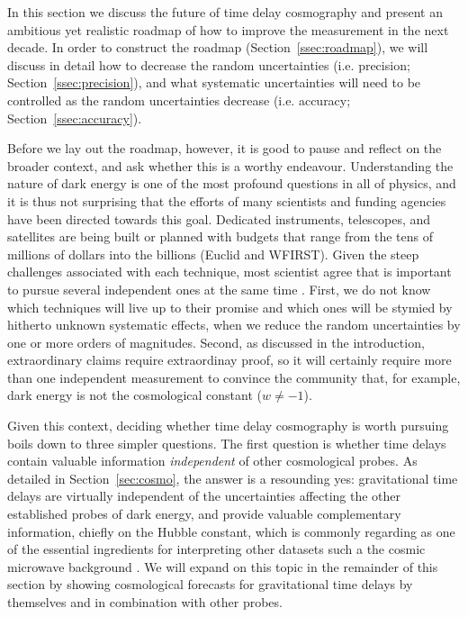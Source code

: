 


In this section we discuss the future of time delay cosmography and
present an ambitious yet realistic roadmap of how to improve the
measurement in the next decade. In order to construct the roadmap
(Section~\ref{ssec:roadmap}), we will discuss in detail how to
decrease the random uncertainties (i.e. precision;
Section~\ref{ssec:precision}), and what systematic uncertainties will
need to be controlled as the random uncertainties decrease
(i.e. accuracy; Section~\ref{ssec:accuracy}).

Before we lay out the roadmap, however, it is good to pause and
reflect on the broader context, and ask whether this is a worthy
endeavour.  Understanding the nature of dark energy is one of the most
profound questions in all of physics, and it is thus not surprising
that the efforts of many scientists and funding agencies have been
directed towards this goal. Dedicated instruments, telescopes, and
satellites are being built or planned with budgets that range from the
tens of millions of dollars into the billions (Euclid and
WFIRST). Given the steep challenges associated with each technique,
most scientist agree that is important to pursue several independent
ones at the same time \citep{DETF,DESC}. First, we do not know which
techniques will live up to their promise and which ones will be
stymied by hitherto unknown systematic effects, when we reduce the
random uncertainties by one or more orders of magnitudes. Second, as
discussed in the introduction, extraordinary claims require
extraordinay proof, so it will certainly require more than one
independent measurement to convince the community that, for example,
dark energy is not the cosmological constant ($w\neq-1$).

Given this context, deciding whether time delay cosmography is worth
pursuing boils down to three simpler questions. The first question is
whether time delays contain valuable information {\it independent} of
other cosmological probes. As detailed in Section~\ref{sec:cosmo}, the
answer is a resounding yes: gravitational time delays are virtually
independent of the uncertainties affecting the other established
probes of dark energy, and provide valuable complementary information,
chiefly on the Hubble constant, which is commonly regarding as one of
the essential ingredients for interpreting other datasets such a the
cosmic microwave background \citep{Hu05,Suy++12,Wei++13,Rie++16}.  We
will expand on this topic in the remainder of this section by showing
cosmological forecasts for gravitational time delays by themselves and
in combination with other probes.


